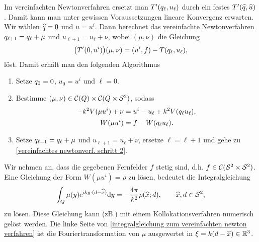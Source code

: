 Im vereinfachten Newtonverfahren ersetzt man \(T'(q_\ell,u_\ell)\) durch ein festes \(T'(\widehat{q},\widehat{u})\). Damit kann man unter gewissen Voraussetzungen lineare Konvergenz erwarten. Wir wählen \(\widehat{q}=0\) und \(\widehat{u}=u^i\). Dann berechnet das vereinfachte Newtonverfahren \(q_{\ell+1}=q_\ell+\mu\) und \(u_{\ell+1}=u_\ell+\nu\), wobei \((\mu,\nu)\) die Gleichung
\begin{equation*}
	\big(T'(0,u^i)\big)(\mu,\nu)=(u^i,f)-T(q_\ell,u_\ell),
\end{equation*}
löst. Damit erhält man den folgenden Algorithmus
\begin{enumerate}[label=(\alph*)]
	\item Setze \(q_0=0\), \(u_0=u^i\) und \(\ell=0\).
	\item\label{vereinfachtes newtonverf. schritt 2} Bestimme \((\mu,\nu)\in\mathcal{C}(Q)\times\mathcal{C}(Q\times\mathcal{S}^2)\), sodass
	\begin{equation}
		\label{problem aus Algorithmus zum vereinfachten newton}
		\begin{aligned}
			-k^2V(\mu u^i)+\nu & =u^i-u_\ell+k^2V(q_\ell u_\ell),\\
			W(\mu u^i) & =f-W(q_\ell u_\ell).
		\end{aligned}
	\end{equation}
	\item Setze \(q_{\ell+1}=q_\ell+\mu\) und \(u_{\ell+1}=u_\ell+\nu\), ersetze \(\ell=\ell+1\) und gehe zu \ref{vereinfachtes newtonverf. schritt 2}.
\end{enumerate}
Wir nehmen an, dass die gegebenen Fernfelder \(f\) stetig sind, d.h. \(f\in\mathcal{C}(\mathcal{S}^2\times\mathcal{S}^2)\). Eine Gleichung der Form \(W(\mu u^i)=\rho\) zu lösen, bedeutet die Integralgleichung
\begin{equation}
	\label{integralgleichung zum vereinfachten newton verfahren}
	\int_Q\mu(y)\mathrm{e}^{\mathrm{i} ky\cdot(d-\widehat{x})}\mathrm{d}y = -\frac{4\pi}{k^2}\rho(\widehat{x};d),\qquad\widehat{x},d\in\mathcal{S}^2,
\end{equation}
zu lösen. Diese Gleichung kann (zB.) mit einem Kollokationsverfahren numerisch gelöst werden. Die linke Seite von \eqref{integralgleichung zum vereinfachten newton verfahren} ist die Fouriertransformation von \(\mu\) ausgewertet in \(\xi=k(d-\widehat{x})\in\mathbb{R}^3\).\vspace{1mm}

